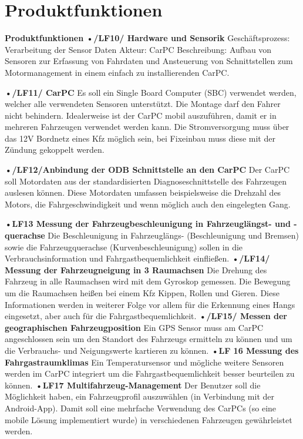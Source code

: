 \chapter{Produktfunktionen}

\textbf{Produktfunktionen}
\textbf{•/LF10/ Hardware und Sensorik}
Geschäftsprozess:	Verarbeitung der Sensor Daten
Akteur:			CarPC
Beschreibung:	Aufbau von Sensoren zur Erfassung von Fahrdaten und Ansteuerung von Schnittstellen zum Motormanagement in einem einfach zu installierenden CarPC.

\textbf{•/LF11/ CarPC}
Es soll ein Single Board Computer (SBC) verwendet werden, welcher alle verwendeten Sensoren unterstützt. Die Montage darf den Fahrer nicht behindern. Idealerweise ist der CarPC mobil auszuführen, damit er in mehreren Fahrzeugen verwendet werden kann. Die Stromversorgung muss über das 12V Bordnetz eines Kfz möglich sein, bei Fixeinbau muss diese mit der Zündung gekoppelt werden.

\textbf{•/LF12/Anbindung der ODB Schnittstelle an den CarPC}
Der CarPC soll Motordaten aus der standardisierten Diagnoseschnittstelle des Fahrzeugen auslesen können. Diese Motordaten umfassen beispielsweise die Drehzahl des Motors, die Fahrgeschwindigkeit und wenn möglich auch den eingelegten Gang.

\textbf{•LF13 Messung der Fahrzeugbeschleunigung in Fahrzeuglängst- und -querachse}
Die Beschleunigung in Fahrzeuglängs- (Beschleunigung und Bremsen) sowie die Fahrzeugquerachse (Kurvenbeschleunigung) sollen in die Verbrauchsinformation und Fahrgastbequemlichkeit einfließen.
\textbf{•/LF14/ Messung der Fahrzeugneigung in 3 Raumachsen}
Die Drehung des Fahrzeug in alle Raumachsen wird mit dem Gyroskop gemessen. Die Bewegung um die Raumachsen heißen bei einem Kfz Kippen, Rollen und Gieren. Diese Informationen werden in weiterer Folge vor allem für die Erkennung eines Hangs eingesetzt, aber auch für die Fahrgastbequemlichkeit.
\textbf{•/LF15/ Messen der geographischen Fahrzeugposition}
Ein GPS Sensor muss am CarPC angeschlossen sein um den Standort des Fahrzeugs ermitteln zu können und um die Verbrauchs- und Neigungswerte kartieren zu können.
\textbf{•LF 16 Messung des Fahrgastraumklimas}
Ein Temperatursensor und mögliche weitere Sensoren werden im CarPC integriert um die Fahrgastbequemlichkeit besser beurteilen zu können.
\textbf{•LF17 Multifahrzeug-Management}
Der Benutzer soll die Möglichkeit haben, ein Fahrzeugprofil auszuwählen (in Verbindung mit der Android-App). Damit soll eine mehrfache Verwendung des CarPCs (so eine mobile Lösung implementiert wurde) in verschiedenen Fahrzeugen gewährleistet werden.



\begin{tabbing}

\end{tabbing}